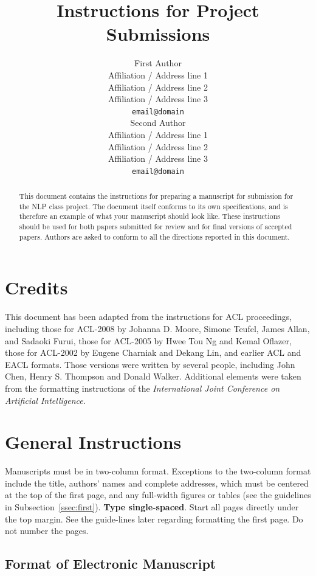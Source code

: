 \documentclass[11pt,letterpaper]{article}
\title{Instructions for Project Submissions}
\author{First Author \\
  Affiliation / Address line 1 \\
  Affiliation / Address line 2 \\
  Affiliation / Address line 3 \\
  {\tt email@domain} \\\And
  Second Author \\
  Affiliation / Address line 1 \\
  Affiliation / Address line 2 \\
  Affiliation / Address line 3 \\
  {\tt email@domain} \\}
\date{}
\begin{document}
\maketitle
\begin{abstract}
  This document contains the instructions for preparing a manuscript for submission for the NLP class project. The document itself conforms to its own specifications, and is therefore an example of what your manuscript should look like. These instructions should be used for both papers submitted for review and for final versions of accepted papers. Authors are asked to conform to all the directions reported in this document.
\end{abstract}

\section{Credits}

This document has been adapted from the instructions for ACL proceedings, including those for ACL-2008 by Johanna D. Moore, Simone Teufel, James Allan, and Sadaoki Furui, those for ACL-2005 by Hwee Tou Ng and Kemal Oflazer, those for ACL-2002 by Eugene Charniak and Dekang Lin, and earlier ACL and EACL formats. Those versions were written by several people, including John Chen, Henry S. Thompson and Donald Walker. Additional elements were taken from the formatting instructions of the {\em International Joint Conference on Artificial Intelligence}.

\section{General Instructions}

Manuscripts must be in two-column format. Exceptions to the two-column format include the title,
authors' names and complete addresses, which must be centered at the top of the first page,
and any full-width figures or tables (see the guidelines in Subsection~\ref{ssec:first}). {\bf Type single-spaced}.
Start all pages directly under the top margin. See the guide-lines later regarding formatting the first page. Do not number the pages.

\subsection{Format of Electronic Manuscript}
\label{sect:pdf}
\end{document}
